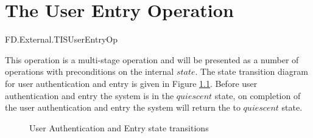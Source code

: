 
\chapter{The User Entry Operation}
\label{sec:UserEntry}

\begin{traceunit}{FD.External.TISUserEntryOp}
\end{traceunit}

\label{sec:userEntry}
This operation is a multi-stage operation and will be presented as 
a number of operations with preconditions on the internal $state$.
The state transition diagram for user authentication and entry is
given in Figure \ref{fig:userEntry}. Before user authentication and
entry the system is in the $quiescent$ state, on completion of the
user authentication and entry the system will return the to
$quiescent$ state.

\begin{figure}[htbp]
  \begin{center}
    \leavevmode
    \caption{User Authentication and Entry state transitions}
    \label{fig:userEntry}
  \end{center}
\end{figure}

